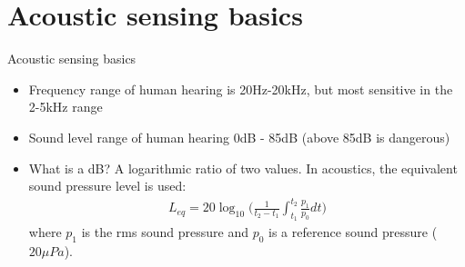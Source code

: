 \documentclass{beamer}
\begin{document}
\section{Acoustic sensing basics}

    \begin{frame}{Acoustic sensing basics}
        \begin{itemize}
            \item Frequency range of human hearing is 20Hz-20kHz, but most sensitive in the 2-5kHz range
            \item Sound level range of human hearing 0dB - 85dB (above 85dB is dangerous)
            \item What is a dB? A logarithmic ratio of two values. In acoustics, the equivalent sound pressure level is used:
            \begin{align*}
                L_{eq} = 20 \log_{10} \bigg( \frac{1}{t_2-t_1}\int_{t_1}^{t_2} \frac{p_1}{p_0} dt \bigg)
            \end{align*}  
            where $p_1$ is the rms sound pressure and $p_0$ is a reference sound pressure ($20 \mu Pa$). 
        \end{itemize}
    \end{frame}
\end{document}
